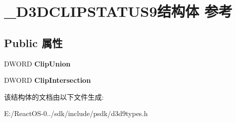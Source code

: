 \hypertarget{struct___d3_d_c_l_i_p_s_t_a_t_u_s9}{}\section{\+\_\+\+D3\+D\+C\+L\+I\+P\+S\+T\+A\+T\+U\+S9结构体 参考}
\label{struct___d3_d_c_l_i_p_s_t_a_t_u_s9}
\subsection*{Public 属性}
\begin{DoxyCompactItemize}
\item 
\mbox{\label{struct___d3_d_c_l_i_p_s_t_a_t_u_s9_abad546301278c90dacdc0e6a2b2b7712}} 
D\+W\+O\+RD {\bfseries Clip\+Union}
\item 
\mbox{\label{struct___d3_d_c_l_i_p_s_t_a_t_u_s9_af2589f959ae77438cb74e6d8d2fde9e6}} 
D\+W\+O\+RD {\bfseries Clip\+Intersection}
\end{DoxyCompactItemize}


该结构体的文档由以下文件生成\+:\begin{DoxyCompactItemize}
\item 
E\+:/\+React\+O\+S-\/0../sdk/include/psdk/d3d9types.\+h\end{DoxyCompactItemize}
